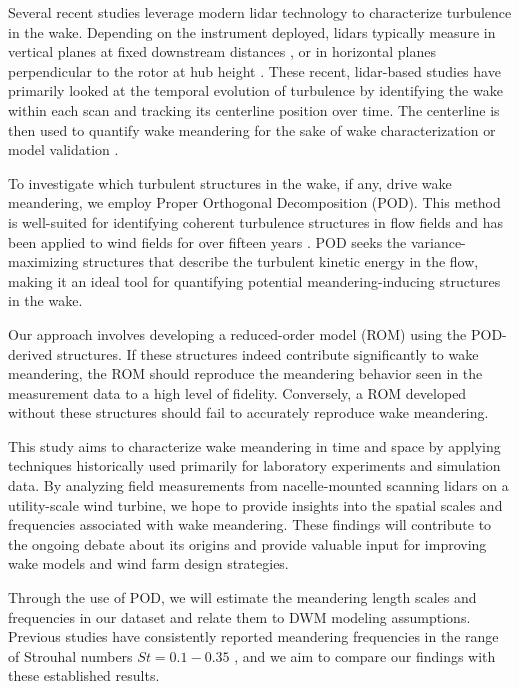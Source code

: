 \documentclass[%
 aip,
 amsmath,
 amssymb,
preprint,%
]{revtex4-2}
\begin{document}
Several recent studies leverage modern lidar technology to characterize turbulence in the wake. 
Depending on the instrument deployed, lidars typically measure in vertical planes at fixed downstream distances \cite{conti_wind_2020, doubrawa2020multimodel, conti_calibration_2021}, or in horizontal planes perpendicular to the rotor at hub height \cite{reinwardt_dynamic_2020, reinwardt_validation_2021}. 
These recent, lidar-based studies have primarily looked at the temporal evolution of turbulence by identifying the wake within each scan and tracking its centerline position over time. 
The centerline is then used to quantify wake meandering for the sake of wake characterization \cite{conti_wind_2020} or model validation \cite{doubrawa2020multimodel}.

To investigate which turbulent structures in the wake, if any, drive wake meandering, we employ Proper Orthogonal Decomposition (POD). 
This method is well-suited for identifying coherent turbulence structures in flow fields \cite{berkooz_proper_1993} and has been applied to wind fields for over fifteen years \cite{spitler_initial_2004, saranyasoontorn_low-dimensional_2005, verhulst_large_2014}. 
POD seeks the variance-maximizing structures that describe the turbulent kinetic energy in the flow, making it an ideal tool for quantifying potential meandering-inducing structures in the wake.

Our approach involves developing a reduced-order model (ROM) using the POD-derived structures. 
If these structures indeed contribute significantly to wake meandering, the ROM should reproduce the meandering behavior seen in the measurement data to a high level of fidelity. 
Conversely, a ROM developed without these structures should fail to accurately reproduce wake meandering.

This study aims to characterize wake meandering in time and space by applying techniques historically used primarily for laboratory experiments and simulation data. 
By analyzing field measurements from nacelle-mounted scanning lidars on a utility-scale wind turbine, we hope to provide insights into the spatial scales and frequencies associated with wake meandering. 
These findings will contribute to the ongoing debate about its origins and provide valuable input for improving wake models and wind farm design strategies.

Through the use of POD, we will estimate the meandering length scales and frequencies in our dataset and relate them to DWM modeling assumptions. 
Previous studies have consistently reported meandering frequencies in the range of Strouhal numbers $St = 0.1
-0.3
5$ \cite{coudou2018experimental, heisel2018spectral}, and we aim to compare our findings with these established results.
\end{document}

